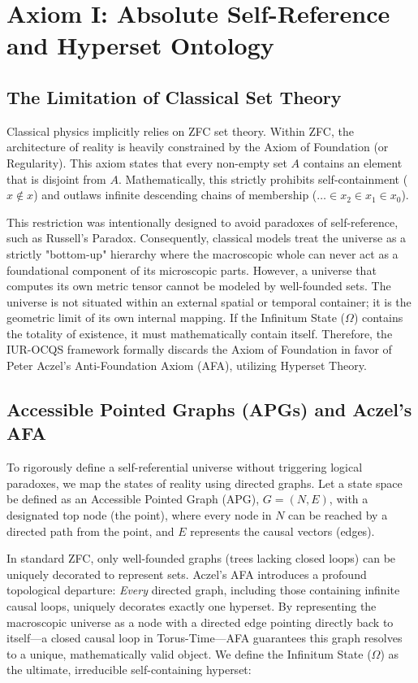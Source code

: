 \documentclass[12pt,openany]{book}
\begin{document}
\section{Axiom I: Absolute Self-Reference and Hyperset Ontology}

\subsection{The Limitation of Classical Set Theory}
Classical physics implicitly relies on ZFC set theory. Within ZFC, the architecture of reality is heavily constrained by the Axiom of Foundation (or Regularity). This axiom states that every non-empty set $A$ contains an element that is disjoint from $A$. Mathematically, this strictly prohibits self-containment ($x \notin x$) and outlaws infinite descending chains of membership ($\dots \in x_2 \in x_1 \in x_0$). 

This restriction was intentionally designed to avoid paradoxes of self-reference, such as Russell's Paradox. Consequently, classical models treat the universe as a strictly "bottom-up" hierarchy where the macroscopic whole can never act as a foundational component of its microscopic parts. However, a universe that computes its own metric tensor cannot be modeled by well-founded sets. The universe is not situated within an external spatial or temporal container; it is the geometric limit of its own internal mapping. If the Infinitum State ($\Omega$) contains the totality of existence, it must mathematically contain itself. Therefore, the IUR-OCQS framework formally discards the Axiom of Foundation in favor of Peter Aczel's Anti-Foundation Axiom (AFA), utilizing Hyperset Theory.

\subsection{Accessible Pointed Graphs (APGs) and Aczel's AFA}
To rigorously define a self-referential universe without triggering logical paradoxes, we map the states of reality using directed graphs. Let a state space be defined as an Accessible Pointed Graph (APG), $G = (N, E)$, with a designated top node (the point), where every node in $N$ can be reached by a directed path from the point, and $E$ represents the causal vectors (edges).

In standard ZFC, only well-founded graphs (trees lacking closed loops) can be uniquely decorated to represent sets. Aczel's AFA introduces a profound topological departure: \textit{Every} directed graph, including those containing infinite causal loops, uniquely decorates exactly one hyperset. By representing the macroscopic universe as a node with a directed edge pointing directly back to itself---a closed causal loop in Torus-Time---AFA guarantees this graph resolves to a unique, mathematically valid object. We define the Infinitum State ($\Omega$) as the ultimate, irreducible self-containing hyperset:
\end{document}
